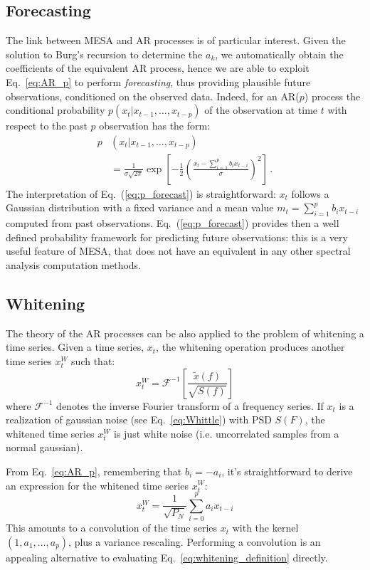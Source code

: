 \documentclass[epj,nopacs]{svjour}
\begin{document}
\subsection{Forecasting} \label{sec:forecasting}
The link between MESA and AR processes is of particular interest. Given the solution to Burg's recursion to determine the $a_k$, we automatically obtain the coefficients of the equivalent AR process, hence we are able to exploit Eq.~\ref{eq:AR_p} to perform \emph{forecasting}, thus providing plausible future observations, conditioned on the observed data.
Indeed, for an AR($p$) process the conditional probability $p(x_t|x_{t-1}, \ldots , x_{t-p})$ of the observation at time $t$ with respect to the past $p$ observation has the form:
\begin{align}\label{eq:p_forecast}
	p&(x_t|x_{t-1}, \ldots , x_{t-p}) \nonumber\\
	&= \frac{1}{\sigma\sqrt{2\pi}} \exp\left[-\frac{1}{2} \left(\frac{x_t - \sum_{i = 1}^p b_i x_{t-i}}{\sigma}\right)^2\right]\,.
\end{align}
The interpretation of Eq.~(\ref{eq:p_forecast}) is straightforward: $x_t$ follows a Gaussian distribution with a fixed variance and a mean value $m_t = \sum_{i = 1}^p b_i x_{t-i}$ computed from past observations.
Eq.~(\ref{eq:p_forecast}) provides then a well defined probability framework for predicting future observations: this is a very useful feature of MESA, that does not have an equivalent in any other spectral analysis computation methods.

\subsection{Whitening} \label{sec:whitening}

The theory of the AR processes can be also applied to the problem of whitening a time series.
Given a time series, $x_t$, the whitening operation produces another time series $x^W_t$ such that:
%
\begin{equation}\label{eq:whitening_definition}
	x^W_t = \mathcal{F}^{-1}\left[ \frac{\tilde{x}(f)}{\sqrt{S(f)}} \right]
\end{equation}
%
where $\mathcal{F}^{-1}$ denotes the inverse Fourier transform of a frequency series.
If $x_t$ is a realization of gaussian noise (see Eq.~\eqref{eq:Whittle}) with PSD $S(F)$, the whitened time series $x^W_t$ is just white noise (i.e. uncorrelated samples from a normal gaussian).

From Eq.~\eqref{eq:AR_p}, remembering that $b_i = - a_i$, it's straightforward to derive an expression for the whitened time series $x^W_t$:
\begin{equation}
	x^W_t = \frac{1}{\sqrt{P_N}} \sum_{i=0}^p a_i x_{t-i}
\end{equation}
This amounts to a convolution of the time series  $x_t$ with the kernel $(1, a_1, \hdots, a_p)$, plus a variance rescaling.
Performing a convolution is an appealing alternative to evaluating Eq.~\eqref{eq:whitening_definition} directly.
\end{document}
